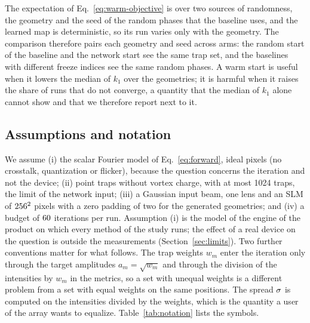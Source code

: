 The expectation of Eq.~\eqref{eq:warm-objective} is over two sources of randomness, the geometry and the seed of the random phases that the baseline uses, and the learned map is deterministic, so its run varies only with the geometry. The comparison therefore pairs each geometry and seed across arms: the random start of the baseline and the network start see the same trap set, and the baselines with different freeze indices see the same random phases. A warm start is useful when it lowers the median of $k_1$ over the geometries; it is harmful when it raises the share of runs that do not converge, a quantity that the median of $k_1$ alone cannot show and that we therefore report next to it.

\subsection{Assumptions and notation}\label{sec:assumptions}

We assume (i) the scalar Fourier model of Eq.~\eqref{eq:forward}, ideal pixels (no crosstalk, quantization or flicker), because the question concerns the iteration and not the device; (ii) point traps without vortex charge, with at most 1024 traps, the limit of the network input; (iii) a Gaussian input beam, one lens and an SLM of $256^2$ pixels with a zero padding of two for the generated
geometries; and (iv) a budget of $60$ iterations per run. Assumption (i) is the model of the engine of the product on which every method of the study runs; the effect of a real device on the question is outside the measurements (Section~\ref{sec:limits}). Two further conventions matter for what follows. The trap weights $w_m$ enter the iteration only through the target amplitudes $a_m=\sqrt{w_m}$ and through the division of the intensities by $w_m$ in the metrics, so a set with unequal weights is a different problem from a set with equal weights on the same positions. The spread $\sigma$ is computed on the intensities divided by the weights, which is the quantity a user of the array wants to equalize. Table~\ref{tab:notation} lists the symbols.

